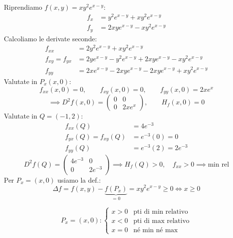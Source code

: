 \begin{solution*}
Riprendiamo $f(x, y) = x y^2 e^{x - y}$:
\begin{align*}
f_x &= y^2 e^{x - y} + x y^2 e^{x - y} \\
f_y &= 2xy e^{x - y} - x y^2 e^{x - y}
\end{align*}
Calcoliamo le derivate seconde:
\begin{align*}
f_{xx} &= 2y^2 e^{x - y} + x y^2 e^{x - y} \\
f_{xy} = f_{yx} &= 2y e^{x - y} - y^2 e^{x - y} + 2xy e^{x - y} - x y^2 e^{x - y} \\
f_{yy} &= 2x e^{x - y} - 2xy e^{x - y} - 2xy e^{x - y} + x y^2 e^{x - y}
\end{align*}
Valutate in $P_x(x, 0)$:
\[
f_{xx}(x, 0) = 0, \qquad f_{xy}(x, 0) = 0, \qquad f_{yy}(x, 0) = 2x e^x
\]
\[
\implies D^2 f(x, 0) = \begin{pmatrix} 0 & 0 \\ 0 & 2x e^x \end{pmatrix}, \qquad H_f(x, 0) = 0
\]
Valutate in $Q = (-1, 2)$:
\begin{align*}
f_{xx}(Q) &= 4 e^{-3} \\
f_{yx}(Q) = f_{xy}(Q) &= e^{-3}(0) = 0 \\
f_{yy}(Q) &= e^{-3}(2) = 2 e^{-3}
\end{align*}
\[
D^2 f(Q) = \begin{pmatrix} 4 e^{-3} & 0 \\ 0 & 2 e^{-3} \end{pmatrix} \implies H_f(Q) > 0, \quad f_{xx} > 0 \implies \text{min rel}
\]
Per $P_x = (x, 0)$ usiamo la def.:
\[
\Delta f = f(x, y) - \underbrace{f(P_x)}_{= 0} = x y^2 e^{x - y} \ge 0 \iff x \ge 0
\]
\begin{center}
\end{center}
\[
P_x = (x, 0) : \begin{cases}
x > 0 & \text{pti di min relativo} \\
x < 0 & \text{pti di max relativo} \\
x = 0 & \text{né min né max}
\end{cases}
\]
\end{solution*}



